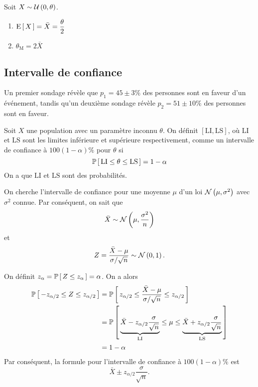 \documentclass[11pt]{article}
\renewcommand\P[1]{%
	\ensuremath{%
		\mathbb{P}\left[\,#1\,\right]%
	}%
}%
\newcommand\Uni[2]{%
	\ensuremath{%
		\mathcal{U}\left(#1,#2\right)%
	}%
}%
\newcommand\Norm[2]{%
	\ensuremath{%
		\mathcal{N}\left(#1,#2\right)%
	}%
}%
\newcommand\Esp[1]{%
	\ensuremath{%
		\mathrm{E}\left[\,#1\,\right]%
	}%
}%
\theoremstyle{remark}
\theoremstyle{definition}
\begin{document}
\begin{exemple}
	Soit $X\sim\Uni{0}{\theta}$.

	\begin{enumerate}
		\item $
			\Esp{X}
			=\bar{X}
			=\dfrac{\theta}{2}
		$

		\item $
			\theta_{\text{M}}
			=2\bar{X}
		$
	\end{enumerate}
\end{exemple}

\subsection{Intervalle de confiance}
\begin{exemple}
	Un premier sondage révèle que $p_1=45\pm 3\%$ des personnes sont en faveur
	d'un événement, tandis qu'un deuxième sondage révèle $p_2=51\pm 10\%$ des
	personnes sont en faveur.
\end{exemple}

\begin{exemple}
	Soit $X$ une population avec un paramètre inconnu $\theta$. On définit 
	$[\mathrm{LI},\mathrm{LS}]$, où $\mathrm{LI}$ et $\mathrm{LS}$ sont les
	limites inférieure et supérieure respectivement, comme un intervalle de
	confiance à $100(1-\alpha)\%$ pour $\theta$ si
	\begin{equation*}
		\P{\mathrm{LI}\leq\theta\leq\mathrm{LS}}=1-\alpha
	\end{equation*}
	On a que $\mathrm{LI}$ et $\mathrm{LS}$ sont des probabilités.
	
	On cherche l'intervalle de confiance pour une moyenne $\mu$ d'un loi
	$\Norm{\mu}{\sigma^2}$ avec $\sigma^2$ connue. Par conséquent, on sait que
	\begin{equation*}
		\bar{X}\sim\Norm{\mu}{\frac{\sigma^2}{n}}
	\end{equation*}
	et
	\begin{equation*}
		Z=\frac{\bar{X}-\mu}{\sigma/\sqrt{n}}\sim\Norm{0}{1}.
	\end{equation*}

	On définit $z_\alpha=\P{Z\leq z_\alpha}=\alpha$. On a alors 
	\begin{equation*}
	\begin{split}
		\P{-z_{\alpha/2}\leq Z\leq z_{\alpha/2}}
		&=\P{z_{\alpha/2}\leq\frac{\bar{X}-\mu}{\sigma/\sqrt{n}}\leq z_{\alpha/2}}\\
		&=\P{
		 \underbrace{\bar{X}-z_{\alpha/2}\frac{\sigma}{\sqrt{n}}}_{\mathrm{LI}}
		 \leq\mu\leq
		 \underbrace{\bar{X}+z_{\alpha/2}\frac{\sigma}{\sqrt{n}}}_{\mathrm{LS}}
		 }\\
		&=1-\alpha
	\end{split}
	\end{equation*}
	Par conséquent, la formule pour l'intervalle de confiance à
	$100(1-\alpha)\%$ est
	\begin{equation*}
		\bar{X}\pm z_{\alpha/2}\frac{\sigma}{\sqrt{n}}.
	\end{equation*}
\end{exemple}
\end{document}
